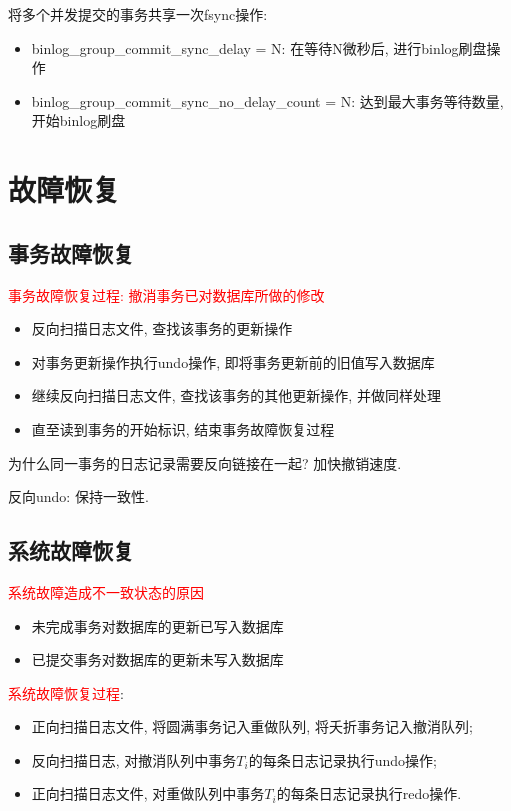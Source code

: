 将多个并发提交的事务共享一次fsync操作:
\begin{itemize}
    \item binlog\_group\_commit\_sync\_delay = N: 在等待N微秒后, 进行binlog刷盘操作
    \item binlog\_group\_commit\_sync\_no\_delay\_count = N: 达到最大事务等待数量, 开始binlog刷盘
\end{itemize}

\section{故障恢复}

\subsection{事务故障恢复}

\textcolor{red}{事务故障恢复过程: 撤消事务已对数据库所做的修改}
\begin{itemize}
    \item 反向扫描日志文件, 查找该事务的更新操作
    \item 对事务更新操作执行undo操作, 即将事务更新前的旧值写入数据库
    \item 继续反向扫描日志文件, 查找该事务的其他更新操作, 并做同样处理
    \item 直至读到事务的开始标识, 结束事务故障恢复过程
\end{itemize}
为什么同一事务的日志记录需要反向链接在一起? 加快撤销速度.

反向undo: 保持一致性.

\subsection{系统故障恢复}

\textcolor{red}{系统故障造成不一致状态的原因}
\begin{itemize}
    \item 未完成事务对数据库的更新已写入数据库
    \item 已提交事务对数据库的更新未写入数据库
\end{itemize}

\textcolor{red}{系统故障恢复过程}:
\begin{itemize}
    \item 正向扫描日志文件, 将圆满事务记入重做队列, 将夭折事务记入撤消队列;
    \item 反向扫描日志, 对撤消队列中事务$T_i$的每条日志记录执行undo操作;
    \item 正向扫描日志文件, 对重做队列中事务$T_i$的每条日志记录执行redo操作.
\end{itemize}


